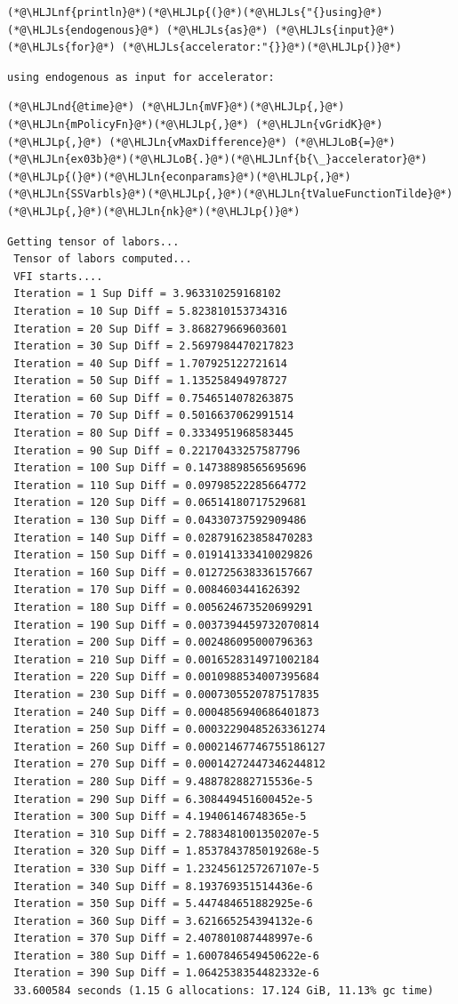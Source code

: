 \documentclass[12pt,a4paper]{article}
\newcommand{\HLJLn}[1]{#1}
\newcommand{\HLJLnd}[1]{\textcolor[RGB]{214,102,97}{#1}}
\newcommand{\HLJLnf}[1]{\textcolor[RGB]{66,102,213}{#1}}
\newcommand{\HLJLs}[1]{\textcolor[RGB]{201,61,57}{#1}}
\newcommand{\HLJLoB}[1]{\textcolor[RGB]{102,102,102}{\textbf{#1}}}
\newcommand{\HLJLp}[1]{#1}
\begin{document}
\begin{lstlisting}
(*@\HLJLnf{println}@*)(*@\HLJLp{(}@*)(*@\HLJLs{"{}using}@*) (*@\HLJLs{endogenous}@*) (*@\HLJLs{as}@*) (*@\HLJLs{input}@*) (*@\HLJLs{for}@*) (*@\HLJLs{accelerator:"{}}@*)(*@\HLJLp{)}@*)
\end{lstlisting}

\begin{lstlisting}
using endogenous as input for accelerator:
\end{lstlisting}


\begin{lstlisting}
(*@\HLJLnd{@time}@*) (*@\HLJLn{mVF}@*)(*@\HLJLp{,}@*) (*@\HLJLn{mPolicyFn}@*)(*@\HLJLp{,}@*) (*@\HLJLn{vGridK}@*)(*@\HLJLp{,}@*) (*@\HLJLn{vMaxDifference}@*) (*@\HLJLoB{=}@*) (*@\HLJLn{ex03b}@*)(*@\HLJLoB{.}@*)(*@\HLJLnf{b{\_}accelerator}@*)(*@\HLJLp{(}@*)(*@\HLJLn{econparams}@*)(*@\HLJLp{,}@*) (*@\HLJLn{SSVarbls}@*)(*@\HLJLp{,}@*)(*@\HLJLn{tValueFunctionTilde}@*)(*@\HLJLp{,}@*)(*@\HLJLn{nk}@*)(*@\HLJLp{)}@*)
\end{lstlisting}

\begin{lstlisting}
Getting tensor of labors... 
 Tensor of labors computed... 
 VFI starts.... 
 Iteration = 1 Sup Diff = 3.963310259168102
 Iteration = 10 Sup Diff = 5.823810153734316
 Iteration = 20 Sup Diff = 3.868279669603601
 Iteration = 30 Sup Diff = 2.5697984470217823
 Iteration = 40 Sup Diff = 1.707925122721614
 Iteration = 50 Sup Diff = 1.135258494978727
 Iteration = 60 Sup Diff = 0.7546514078263875
 Iteration = 70 Sup Diff = 0.5016637062991514
 Iteration = 80 Sup Diff = 0.3334951968583445
 Iteration = 90 Sup Diff = 0.22170433257587796
 Iteration = 100 Sup Diff = 0.14738898565695696
 Iteration = 110 Sup Diff = 0.09798522285664772
 Iteration = 120 Sup Diff = 0.06514180717529681
 Iteration = 130 Sup Diff = 0.04330737592909486
 Iteration = 140 Sup Diff = 0.028791623858470283
 Iteration = 150 Sup Diff = 0.019141333410029826
 Iteration = 160 Sup Diff = 0.012725638336157667
 Iteration = 170 Sup Diff = 0.0084603441626392
 Iteration = 180 Sup Diff = 0.005624673520699291
 Iteration = 190 Sup Diff = 0.0037394459732070814
 Iteration = 200 Sup Diff = 0.002486095000796363
 Iteration = 210 Sup Diff = 0.0016528314971002184
 Iteration = 220 Sup Diff = 0.0010988534007395684
 Iteration = 230 Sup Diff = 0.0007305520787517835
 Iteration = 240 Sup Diff = 0.0004856940686401873
 Iteration = 250 Sup Diff = 0.00032290485263361274
 Iteration = 260 Sup Diff = 0.00021467746755186127
 Iteration = 270 Sup Diff = 0.00014272447346244812
 Iteration = 280 Sup Diff = 9.488782882715536e-5
 Iteration = 290 Sup Diff = 6.308449451600452e-5
 Iteration = 300 Sup Diff = 4.19406146748365e-5
 Iteration = 310 Sup Diff = 2.7883481001350207e-5
 Iteration = 320 Sup Diff = 1.8537843785019268e-5
 Iteration = 330 Sup Diff = 1.2324561257267107e-5
 Iteration = 340 Sup Diff = 8.193769351514436e-6
 Iteration = 350 Sup Diff = 5.447484651882925e-6
 Iteration = 360 Sup Diff = 3.621665254394132e-6
 Iteration = 370 Sup Diff = 2.407801087448997e-6
 Iteration = 380 Sup Diff = 1.6007846549450622e-6
 Iteration = 390 Sup Diff = 1.0642538354482332e-6
 33.600584 seconds (1.15 G allocations: 17.124 GiB, 11.13% gc time)
\end{lstlisting}
\end{document}
